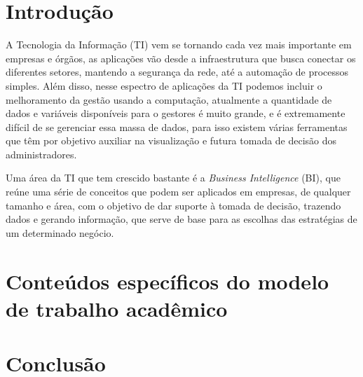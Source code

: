 \chapter{Introdução}

A Tecnologia da Informação (TI) vem se tornando cada vez mais importante em empresas e órgãos, as aplicações vão desde a infraestrutura que busca conectar os diferentes setores, mantendo a segurança da rede, até a automação de processos simples. Além disso, nesse espectro de aplicações da TI podemos incluir o melhoramento da gestão usando a computação, atualmente a quantidade de dados e variáveis disponíveis para o gestores é muito grande, e é extremamente difícil de se gerenciar essa massa de dados, para isso existem várias ferramentas que têm por objetivo auxiliar na visualização e futura tomada de decisão dos administradores.

Uma área da TI que tem crescido bastante é a \textit{Business Intelligence} (BI), que reúne uma série de conceitos que podem ser aplicados em empresas, de qualquer tamanho e área, com o objetivo de dar suporte à tomada de decisão, trazendo dados e gerando informação, que serve de base para as escolhas das estratégias de um determinado negócio.  



%




\chapter{Conteúdos específicos do modelo de trabalho acadêmico}\label{cap_trabalho_academico}


\chapter{Conclusão}
\lipsum[31-33]